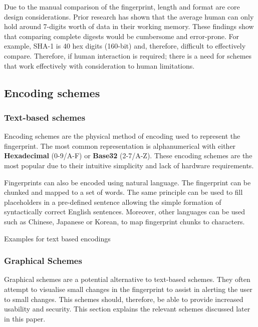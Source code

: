 Due to the manual comparison of the fingerprint, length and format are core design considerations. Prior research has shown that the average human can only hold around 7-digits worth of data in their working memory\cite{miller1956magical}. These findings show that comparing complete digests would be cumbersome and error-prone. For example, SHA-1 is 40 hex digits (160-bit) and, therefore, difficult to effectively compare. Therefore, if human interaction is required; there is a need for schemes that work effectively with consideration to human limitations.

\newpage

\subsection{Encoding schemes}
\label{sec:encodingSchemes}

\subsubsection*{Text-based schemes}
Encoding schemes are the physical method of encoding used to represent the fingerprint. The most common representation is alphanumerical with either \textbf{Hexadecimal} (0-9/A-F) or \textbf{Base32} (2-7/A-Z). These encoding schemes are the most popular due to their intuitive simplicity and lack of hardware requirements.

Fingerprints can also be encoded using natural language. The fingerprint can be chunked and mapped to a set of words. The same principle can be used to fill placeholders in a pre-defined sentence allowing the simple formation of syntactically correct English sentences. Moreover, other languages can be used such as Chinese, Japanese or Korean, to map fingerprint chunks to characters.

\begin{table}[h!]
    \centering
    
    \caption{Examples for text based encodings}
\end{table}

\subsubsection*{Graphical Schemes}
Graphical schemes are a potential alternative to text-based schemes. They often attempt to visualise small changes in the fingerprint to assist in alerting the user to small changes. This schemes should, therefore, be able to provide increased usability and security. This section explains the relevant schemes discussed later in this paper.


